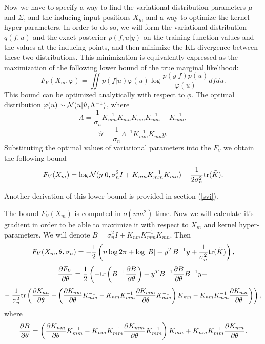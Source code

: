 \documentclass[12pt]{article}
\begin{document}
		Now we have to specify a way to find the variational distribution parameters $\mu$ and $\Sigma$, and the inducing input positions $X_m$ and a way to optimize the kernel hyper-parameters. 
		In order to do so, we will form the variational distribution $q(f, u)$ and the exact posterior $p(f, u|y)$ on the training function values and the values at the inducing points, and then minimize the KL-divergence between these two distributions. This minimization is equivalently expressed as the maximization of the following lower bound of the true marginal likelihood:
		$$F_V(X_m, \varphi) = \iint p(f|u) \varphi(u) \log \frac{p(y|f) p(u)}{\varphi(u)} df du.$$
		This bound can be optimized analytically with respect to $\phi$. The optimal distribution $\varphi(u) \sim \mathcal{N}(u|\hat u, \Lambda^{-1})$, where
		$$\Lambda = \frac 1 {\sigma_n} K_{mm}^{-1} K_{mn} K_{nm} K_{mm}^{-1} + K_{mm}^{-1},$$
		$$\hat u = \frac 1 {\sigma_n} \Lambda^{-1} K_{mm}^{-1} K_{mn} y.$$
		Substituting the optimal values of variational parameters into the $F_V$ we obtain the following bound
		$$F_V(X_m) = \log \mathcal{N}(y|0, \sigma_n^2 I + K_{nm} K_{mm}^{-1} K_{mn}) - \frac 1 {2\sigma_n^2} \mbox{tr}(\tilde K).$$

		Another derivation of this lower bound is provided in section (\ref{svi}).

		The bound $F_V(X_m)$ is computed in $o(nm^2)$ time. Now we will calculate it's gradient in order to be able to maximize it with respect to $X_m$ and kernel hyper-parameters. We will denote $B = \sigma_n^2 I + K_{nm} K_{mm}^{-1} K_{mn}$. Then
		$$F_V(X_m, \theta, \sigma_n) = -\frac 1 2 \left(n \log 2\pi + \log |B| + y^T B^{-1} y + \frac 1 {\sigma_n^2} \mbox{tr}(\tilde K)\right),$$
		$$\frac{\partial F_V}{\partial \theta} = \frac 1 2 \left( -\mbox{tr} \left(B^{-1} \frac{\partial B}{\partial \theta}\right) + y^T B^{-1} \frac{\partial B}{\partial \theta} B^{-1} y - \right.$$    
		$$- \left. \frac 1 {\sigma_n^2} \mbox{tr}\left(\frac{\partial K_{nn}}{\partial \theta} - \left(\frac{\partial K_{nm}}{\partial \theta}K_{mm}^{-1} - K_{nm} K_{mm}^{-1} \frac{\partial K_{mm}}{\partial \theta}K_{mm}^{-1}\right) K_{mn} - K_{nm} K_{mm}^{-1} \frac{\partial K_{mn}}{\partial \theta}\right)\right),$$
		where
		$$\frac{\partial B}{\partial \theta} = \left(\frac{\partial K_{nm}}{\partial \theta}K_{mm}^{-1} - K_{nm} K_{mm}^{-1} \frac{\partial K_{mm}}{\partial \theta}K_{mm}^{-1}\right) K_{mn} +  K_{nm} K_{mm}^{-1} \frac{\partial K_{mn}}{\partial \theta}.$$
\end{document}
